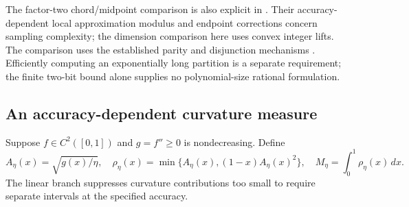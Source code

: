 The factor-two chord/midpoint comparison is also explicit in
\citet[Lemma 2.1]{simchowitz2018}. Their accuracy-dependent local
approximation modulus and endpoint corrections concern sampling
complexity; the dimension comparison here uses convex integer lifts.
The comparison uses the established parity and disjunction mechanisms
\citep{lubin2022,vielma2018}. Efficiently computing an exponentially
long partition is a separate requirement; the finite two-bit bound
alone supplies no polynomial-size rational formulation.

\subsection{An accuracy-dependent curvature measure}

Suppose $f\in C^2([0,1])$ and $g=f''\ge0$ is nondecreasing. Define
\begin{equation}\label{eq:curvature-density}
 A_\eta(x)=\sqrt{g(x)/\eta},\quad
 \rho_\eta(x)=\min\{A_\eta(x),(1-x)A_\eta(x)^2\},\quad
 M_\eta=\int_0^1\rho_\eta(x)\,dx.
\end{equation}
The linear branch suppresses curvature contributions too small to
require separate intervals at the specified accuracy.

